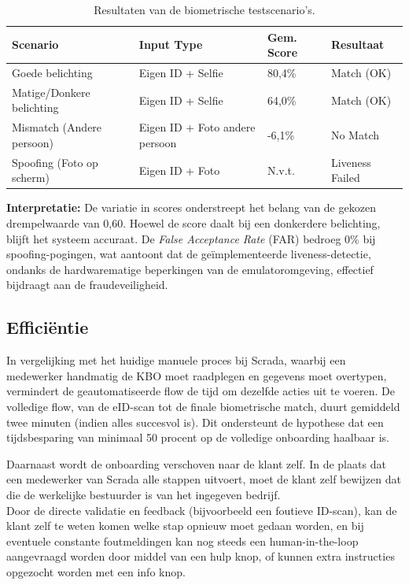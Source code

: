 \begin{itemize}
\begin{table}[ht]
    \centering
    \begin{tabular}{|l|l|l|l|}
    \hline
    \textbf{Scenario} & \textbf{Input Type} & \textbf{Gem. Score} & \textbf{Resultaat} \\ \hline
    Goede belichting & Eigen ID + Selfie & 80,4\% & Match (OK) \\ \hline
    Matige/Donkere belichting & Eigen ID + Selfie & 64,0\% & Match (OK) \\ \hline
    Mismatch (Andere persoon) & Eigen ID + Foto andere persoon & -6,1\% & No Match \\ \hline
    Spoofing (Foto op scherm) & Eigen ID + Foto & N.v.t. & Liveness Failed \\ \hline
    \end{tabular}
    \caption{Resultaten van de biometrische testscenario's.}
    \label{tab:biometrische-testresultaten}
\end{table}

\noindent \textbf{Interpretatie:} De variatie in scores onderstreept het belang van de gekozen drempelwaarde van 0,60. Hoewel de score daalt bij een donkerdere belichting, blijft het systeem accuraat. De \textit{False Acceptance Rate} (FAR) bedroeg 0\% bij spoofing-pogingen, wat aantoont dat de geïmplementeerde liveness-detectie, ondanks de hardwarematige beperkingen van de emulatoromgeving, effectief bijdraagt aan de fraudeveiligheid.

\subsection{Efficiëntie}
In vergelijking met het huidige manuele proces bij Scrada, waarbij een medewerker handmatig de KBO moet raadplegen en gegevens moet overtypen, vermindert de geautomatiseerde flow de tijd om dezelfde acties uit te voeren. 
De volledige flow, van de eID-scan tot de finale biometrische match, duurt gemiddeld twee minuten (indien alles succesvol is). Dit ondersteunt de hypothese dat een tijdsbesparing van minimaal 50 procent op de volledige onboarding haalbaar is.

Daarnaast wordt de onboarding verschoven naar de klant zelf. In de plaats dat een medewerker van Scrada alle stappen uitvoert, moet de klant zelf bewijzen dat die de werkelijke bestuurder is van het ingegeven bedrijf.
\\ Door de directe validatie en feedback (bijvoorbeeld een foutieve ID-scan), kan de klant zelf te weten komen welke stap opnieuw moet gedaan worden, en bij eventuele constante foutmeldingen kan nog steeds een human-in-the-loop 
aangevraagd worden door middel van een hulp knop, of kunnen extra instructies opgezocht worden met een info knop.


\end{itemize}
